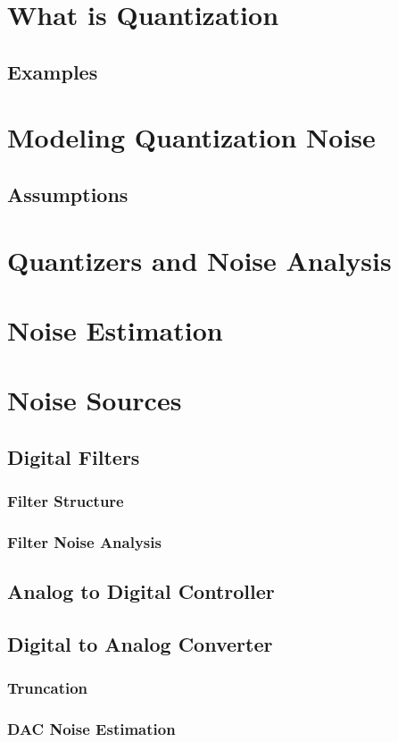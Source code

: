 
\section{What is Quantization}
    \subsection{Examples}
\section{Modeling Quantization Noise}
	\subsection{Assumptions}
\section{Quantizers and Noise Analysis}

    
\section{Noise Estimation}
\section{Noise Sources}
    \subsection{Digital Filters}
	    \subsubsection{Filter Structure}
    		\subsubsection{Filter Noise Analysis}
    \subsection{Analog to Digital Controller}
	\subsection{Digital to Analog Converter}
    		\subsubsection{Truncation}
        \subsubsection{DAC Noise Estimation}



